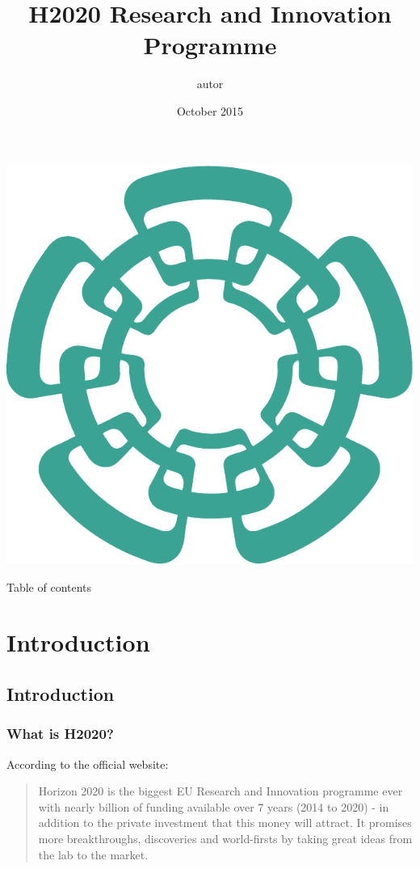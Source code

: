 \documentclass[compress,9pt,xcolor={dvipsnames,table}]{beamer}
\title[H2020 Research and Innovation Programme]{H2020 Research and Innovation Programme}
\author{autor}
\institute{Cinvestav Tamaulipas}
\date{October 2015}
\begin{document}
\begin{frame}[plain]
  \begin{center}
  \includegraphics[scale=0.12]{../../../resources/images/vectors/cinvestav-logo-no-text}
  \end{center}
  \titlepage
  
\end{frame}


\begin{frame}{Table of contents}
	\tableofcontents[hideallsubsections]
\end{frame}

\section{Introduction}
\subsection{Introduction}
\begin{frame}\frametitle{What is H2020?}
According to the official website:
\begin{quotation}
Horizon 2020 is the biggest EU Research and Innovation programme ever with nearly  billion of funding available over 7 years (2014 to 2020) - in addition to the private investment that this money will attract. It promises more breakthroughs, discoveries and world-firsts by taking great ideas from the lab to the market.
\end{quotation}

\end{frame}
\end{document}
